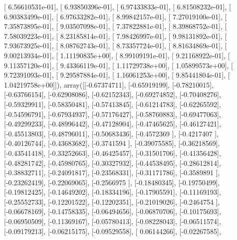 \documentclass{article}
\begin{document}
       [  6.56610531e-01],
       [  6.93850396e-01],
       [  6.97433833e-01],
       [  6.81508232e-01],
       [  6.90383499e-01],
       [  6.97633282e-01],
       [  8.99842157e-01],
       [  7.27019100e-01],
       [  7.35873895e-01],
       [  9.03507098e-01],
       [  7.37822881e-01],
       [  8.39868752e-01],
       [  7.58039223e-01],
       [  8.23185814e-01],
       [  7.98426997e-01],
       [  9.98131892e-01],
       [  7.93673925e-01],
       [  8.08762743e-01],
       [  8.73357724e-01],
       [  8.81634869e-01],
       [  9.00213934e-01],
       [  1.11190835e+00],
       [  8.99109191e-01],
       [  9.21168922e-01],
       [  9.11357120e-01],
       [  9.43366119e-01],
       [  1.11729738e+00],
       [  1.05899573e+00],
       [  9.72391093e-01],
       [  9.29587884e-01],
       [  1.16061253e+00],
       [  9.85441804e-01],
       [  1.04219758e+00]]), array([[-0.67374711],
       [-0.65919199],
       [-0.78210015],
       [-0.63766154],
       [-0.62908086],
       [-0.62152343],
       [-0.69274852],
       [-0.70408276],
       [-0.59329911],
       [-0.58350481],
       [-0.57413845],
       [-0.61214783],
       [-0.62265592],
       [-0.54596791],
       [-0.67934937],
       [-0.57176427],
       [-0.58760883],
       [-0.69477063],
       [-0.49299233],
       [-0.48996442],
       [-0.47128904],
       [-0.47465625],
       [-0.46127421],
       [-0.45513803],
       [-0.48796011],
       [-0.50683436],
       [-0.4572369 ],
       [-0.4217407 ],
       [-0.40126744],
       [-0.43683682],
       [-0.3741594 ],
       [-0.39075585],
       [-0.36218569],
       [-0.43541418],
       [-0.33252663],
       [-0.46425457],
       [-0.31501706],
       [-0.41356428],
       [-0.48281742],
       [-0.45980765],
       [-0.30327932],
       [-0.44538495],
       [-0.28612814],
       [-0.38832711],
       [-0.24091817],
       [-0.23568331],
       [-0.31171786],
       [-0.3589891 ],
       [-0.23262419],
       [-0.22069065],
       [-0.2566975 ],
       [-0.18480345],
       [-0.19750499],
       [-0.19812425],
       [-0.14649202],
       [-0.18334196],
       [-0.17905591],
       [-0.11169193],
       [-0.25552733],
       [-0.12201522],
       [-0.12202351],
       [-0.21019026],
       [-0.2464754 ],
       [-0.06678169],
       [-0.14758335],
       [-0.06494656],
       [-0.06870706],
       [-0.10175693],
       [-0.06950509],
       [-0.11369167],
       [-0.05780413],
       [-0.08228043],
       [-0.06511574],
       [-0.09179213],
       [-0.06215175],
       [-0.09529558],
       [ 0.06144266],
       [-0.02267585],
\end{document}

